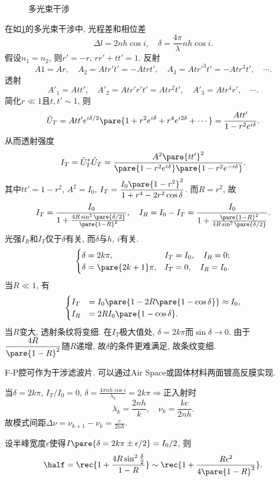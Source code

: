 \documentclass{ctexart}
\begin{document}
\begin{figure}[ht]
    \centering
    \caption{多光束干涉}
    \label{fig:多光束干涉}
\end{figure}
在如\cref{fig:多光束干涉}的多光束干涉中, 光程差和相位差
\[ \Delta l = 2nh\cos i, \quad \delta = \frac{4\pi}{\lambda}nh\cos i. \]
假设$n_1 = n_2$, 则$r' = -r$, $rr'+tt' = 1$. 反射
\[ A1 = Ar,\quad A_2 = Atr't' = -Atrt',\quad A_3 = Atr'^3 t' = -Atr^3 t',\quad \cdots. \]
透射
\[ A'_1 = Att',\quad A'_2 = Atr'r't' = Atr^2 t',\quad A'_3 = Atr^4 r',\quad \cdots. \]
简化$r\ll 1$且$t,t'\sim 1$, 则
\[ \tilde{U}_T = Att' e^{i\delta/2} \pare{1+r^2 e^{i\delta} + r^4 e^{i2\delta} + \cdots} = \frac{Att'}{1-r^2 e^{i\delta}}. \]
从而透射强度
\[ I_T = \tilde{U}_T^* \tilde{U}_T = \frac{A^2\pare{tt'}^2}{\pare{1-r^2e^{i\delta}}\pare{1-r^2e^{-i\delta}}}. \]
其中$tt' = 1-r^2$, $A^2 = I_0$, $I_T = \displaystyle\frac{I_0\pare{1-r^2}^2}{1+r^4-2r^2\cos\delta}$. 而$R=r^2$, 故
\[ I_T = \frac{I_0}{1+\frac{4R\sin^2\pare{\delta/2}}{\pare{1-R}^2}},\quad I_R = I_0 - I_T = \frac{I_0}{1+\frac{\pare{1-R}^2}{4R\sin^2\pare{\delta/2}}}. \]
光强$I_R$和$I_T$仅于$\delta$有关, 而$\delta$与$h$, $i$有关.
\[ \begin{cases}
    \delta = 2k\pi,& I_T = I_0,\quad I_R = 0; \\
    \delta = \pare{2k+1}\pi,& I_T = 0,\quad I_R = I_0.
\end{cases} \]
当$R\ll 1$, 有
\[ \begin{cases}
    I_T &= I_0\pare{1-2R\pare{1-\cos\delta}} \approx I_0,\\
    I_R &= 2RI_0\pare{1-\cos\delta}.
\end{cases} \]
当$R$变大, 透射条纹将变细. 在$I_T$极大值处, $\delta = 2k\pi$而$\sin\delta\rightarrow 0$. 由于$\displaystyle\frac{4R}{\pare{1-R}^2}$随$R$递增, 故$\delta$的条件更难满足, 故条纹变细.
\begin{figure}[ht]
    \centering
\end{figure}
\par
F-P腔可作为干涉滤波片. 可以通过Air Space或固体材料两面镀高反膜实现.
\par
当$\delta = 2k\pi$, $I_T/I_0 = 0$, $\displaystyle \delta = \frac{4\pi nh\cos i}{\lambda_k} = 2k\pi\Rightarrow$正入射时
\[ \lambda_k = \frac{2nh}{k},\quad \nu_k = \frac{kc}{2nh}. \]
故模式间距$\Delta \nu = \nu_{k+1} - \nu_k = \displaystyle \frac{c}{2nh}$.
\par
设半峰宽度$\epsilon$使得$I\pare{\delta = 2k\pi \pm \epsilon/2} = I_0/2$, 则
\[ \half = \rec{1+\frac{4R\sin^2\frac{\delta}{2}}{1-R}} \sim \rec{1+\frac{R\epsilon^2}{4\pare{1-R}^2}}. \]
\end{document}
